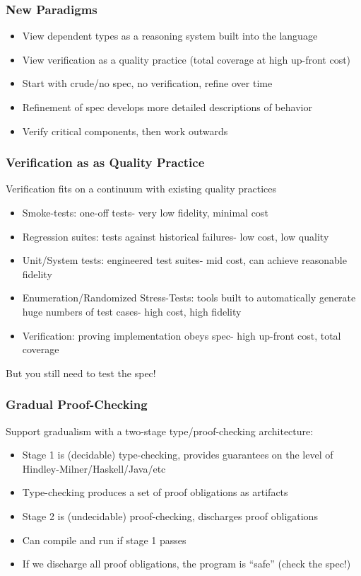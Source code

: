 \documentclass{beamer}
\begin{document}
\begin{frame}
  \frametitle{New Paradigms}
  \begin{itemize}
    \item View dependent types as a reasoning system built into the language
    \item View verification as a quality practice (total coverage at
      high up-front cost)
    \item Start with crude/no spec, no verification, refine over time
    \item Refinement of spec develops more detailed descriptions of behavior
    \item Verify critical components, then work outwards
  \end{itemize}
\end{frame}

\begin{frame}
  \frametitle{Verification as as Quality Practice}
  Verification fits on a continuum with existing quality practices
  \begin{itemize}
    \item Smoke-tests: one-off tests- very low fidelity, minimal cost
    \item Regression suites: tests against historical failures- low
      cost, low quality
    \item Unit/System tests: engineered test suites- mid cost, can
      achieve reasonable fidelity
    \item Enumeration/Randomized Stress-Tests: tools built to
      automatically generate huge numbers of test cases- high cost,
      high fidelity
    \item Verification: proving implementation obeys spec- high
      up-front cost, total coverage
  \end{itemize}
  But you still need to test the spec!
\end{frame}

\begin{frame}
  \frametitle{Gradual Proof-Checking}
  Support gradualism with a two-stage type/proof-checking architecture:
  \begin{itemize}
    \item Stage 1 is (decidable) type-checking, provides guarantees on
      the level of Hindley-Milner/Haskell/Java/etc
    \item Type-checking produces a set of proof obligations as artifacts
    \item Stage 2 is (undecidable) proof-checking, discharges proof
      obligations
    \item Can compile and run if stage 1 passes
    \item If we discharge all proof obligations, the program is
      ``safe'' (check the spec!)
  \end{itemize}
\end{frame}
\end{document}
